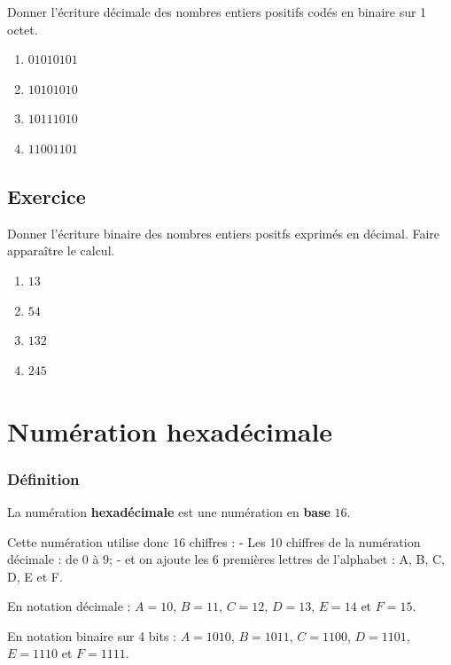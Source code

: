\documentclass[11pt]{article}
\providecommand{\tightlist}{%
      \setlength{\itemsep}{0pt}\setlength{\parskip}{0pt}}
\begin{document}
Donner l'écriture décimale des nombres entiers positifs codés en binaire
sur 1 octet.

\begin{enumerate}
\def\labelenumi{\arabic{enumi}.}
\tightlist
\item
  \(01010101\)
\item
  \(10101010\)
\item
  \(10111010\)
\item
  \(11001101\)
\end{enumerate}

\hypertarget{exercice-1}{%
\subsection{Exercice}\label{exercice-1}}

Donner l'écriture binaire des nombres entiers positfs exprimés en
décimal. Faire apparaître le calcul.

\begin{enumerate}
\def\labelenumi{\arabic{enumi}.}
\tightlist
\item
  \(13\)
\item
  \(54\)
\item
  \(132\)
\item
  \(245\)
\end{enumerate}

    \hypertarget{numuxe9ration-hexaduxe9cimale}{%
\section{Numération hexadécimale}\label{numuxe9ration-hexaduxe9cimale}}

\hypertarget{duxe9finition}{%
\subsubsection*{Définition}\label{duxe9finition}}

La numération \textbf{hexadécimale} est une numération en \textbf{base}
\(16\).

Cette numération utilise donc \(16\) chiffres : - Les 10 chiffres de la
numération décimale : de \(0\) à \(9\); - et on ajoute les 6 premières
lettres de l'alphabet : A, B, C, D, E et F.

En notation décimale : \(A=10\), \(B=11\), \(C=12\), \(D=13\), \(E=14\)
et \(F=15\).

En notation binaire sur 4 bits : \(A=1010\), \(B=1011\), \(C=1100\),
\(D=1101\), \(E=1110\) et \(F=1111\).
\end{document}
